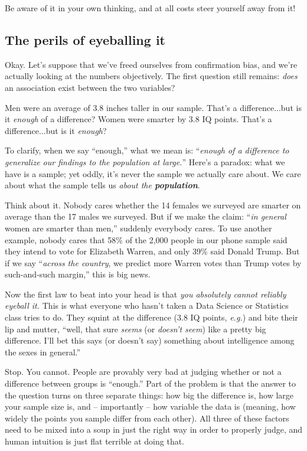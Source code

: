 Be aware of it in your own thinking, and at all costs steer yourself away from
it!

\subsection{The perils of eyeballing it}

Okay. Let's suppose that we've freed ourselves from confirmation bias, and
we're actually looking at the numbers objectively. The first question still
remains: \textit{does} an association exist between the two variables?

Men were an average of 3.8 inches taller in our sample. That's a
difference...but is it \textit{enough} of a difference? Women were smarter by
3.8 IQ points. That's a difference...but is it \textit{enough}?


To clarify, when we say ``enough,'' what we mean is: ``\textit{enough of a
difference to generalize our findings to the population at large.}'' Here's a
paradox: what we have is a sample; yet oddly, it's never the sample we actually
care about. We care about what the sample tells us \textit{about the
\textbf{population}}.


Think about it. Nobody cares whether the 14 females we surveyed are smarter on
average than the 17 males we surveyed. But if we make the claim: ``\textit{in
general} women are smarter than men,'' suddenly everybody cares. To use another
example, nobody cares that 58\% of the 2,000 people in our phone sample said
they intend to vote for Elizabeth Warren, and only 39\% said Donald Trump. But
if we say ``\textit{across the country}, we predict more Warren votes than
Trump votes by such-and-such margin,'' this is big news.


Now the first law to beat into your head is that \textit{you absolutely cannot
reliably eyeball it.} This is what everyone who hasn't taken a Data Science or
Statistics class tries to do. They squint at the difference (3.8 IQ points,
\textit{e.g.}) and bite their lip and mutter, ``well, that sure \textit{seems}
(or \textit{doesn't seem}) like a pretty big difference. I'll bet this says (or
doesn't say) something about intelligence among the sexes in general.''

Stop. You cannot. People are provably very bad at judging whether or not a
difference between groups is ``enough.'' Part of the problem is that the answer
to the question turns on three separate things: how big the difference is, how
large your sample size is, and -- importantly -- how variable the data is
(meaning, how widely the points you sample differ from each other). All three
of these factors need to be mixed into a soup in just the right way in order to
properly judge, and human intuition is just flat terrible at doing that.

